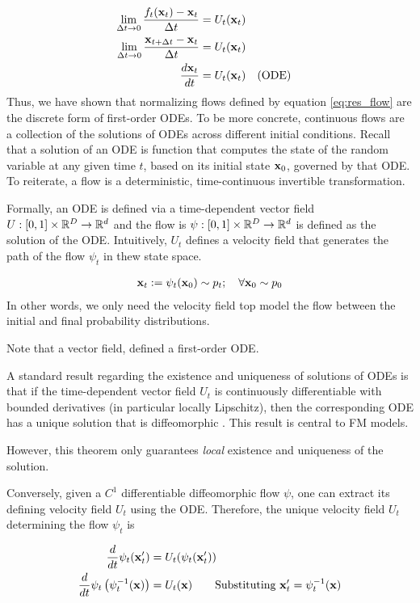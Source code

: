 \documentclass[a4paper, 11pt]{article}
\begin{document}
\begin{align}\label{eq:flow_ode}
    \lim_{\Delta t \to 0} \frac{f_t(\mbox{$\mbox{$\mathbf{x}$}$}_t) - \mbox{$\mbox{$\mathbf{x}$}$}_t}{\Delta t} &= U_t(\mbox{$\mbox{$\mathbf{x}$}$}_t)\\
    \lim_{\Delta t \to 0} \frac{ \mbox{$\mbox{$\mathbf{x}$}$}_{t + \Delta t} - \mbox{$\mbox{$\mathbf{x}$}$}_t}{\Delta t} &= U_t(\mbox{$\mbox{$\mathbf{x}$}$}_t) \\ 
    \frac{d \mbox{$\mbox{$\mathbf{x}$}$}_t}{dt} &= U_t(\mbox{$\mbox{$\mathbf{x}$}$}_t) && \text{(ODE)}
\end{align}
Thus, we have shown that normalizing flows defined by equation \eqref{eq:res_flow} are the discrete form of first-order ODEs. To be more concrete, continuous flows are a collection of the solutions of ODEs across different initial conditions. Recall that a solution of an ODE is function that computes the state of the random variable at any given time $t$, based on its initial state $\mbox{$\mbox{$\mathbf{x}$}$}_0$, governed by that ODE. To reiterate, a flow is a deterministic, time-continuous invertible transformation.
   

Formally, an ODE is defined via a time-dependent vector field $U:[0, 1] \times \mathbb{R}^D \to \mathbb{R}^d$ and the flow is $\psi:[0,1] \times \mathbb{R}^D \to \mathbb{R}^d$ is defined as the solution of the ODE. Intuitively, $U_t$ defines a velocity field that generates the path of the flow $\psi_t$ in thew state space. 

\begin{align}
    \mbox{$\mbox{$\mathbf{x}$}$}_t := \psi_t(\mbox{$\mbox{$\mathbf{x}$}$}_0) \sim p_t; \quad \forall \mbox{$\mbox{$\mathbf{x}$}$}_0 \sim p_0
\end{align}
In other words, we only need the velocity field top model the flow between the initial and final probability distributions.

Note that a vector field, defined a first-order ODE.

A standard result regarding the existence and uniqueness of solutions of ODEs is that if the time-dependent vector field $U_t$ is continuously differentiable with bounded derivatives (in particular locally Lipschitz), then the corresponding ODE has a unique solution that is diffeomorphic \citep{perko2013differential}. This result is central to FM models. 

However, this theorem only guarantees \textit{local} existence and uniqueness of the solution. 

Conversely, given a $C^1$ differentiable diffeomorphic flow $\psi$, one can extract its defining velocity field $U_t$ using the ODE. Therefore, the unique velocity field $U_t$ determining the flow $\psi_t$ is 

\begin{align}
    \frac{d}{dt}\psi_t(\mbox{$\mbox{$\mathbf{x}$}$}'_t) &= U_t(\psi_t(\mbox{$\mbox{$\mathbf{x}$}$}'_t))\\
    \frac{d}{dt}\psi_t \left (\psi_t^{-1}(\mbox{$\mbox{$\mathbf{x}$}$}) \right) &= U_t(\mbox{$\mbox{$\mathbf{x}$}$}) \qquad \text{Substituting }\mbox{$\mbox{$\mathbf{x}$}$}'_t = \psi_t^{-1}(\mbox{$\mbox{$\mathbf{x}$}$})
\end{align}
\end{document}
